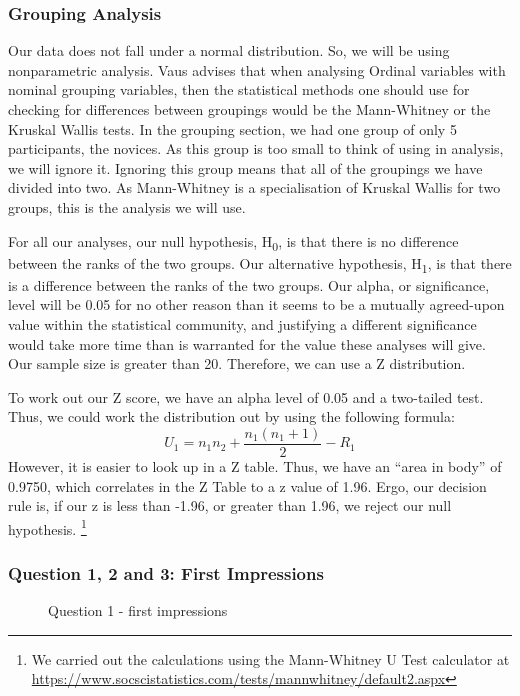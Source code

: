 \subsubsection{Grouping Analysis}
Our data does not fall under a normal distribution. 
So, we will be using nonparametric analysis.
Vaus\cite{de2013surveys} advises that when analysing Ordinal variables with nominal grouping variables, then the statistical methods one should use for checking for differences between groupings would be the Mann-Whitney\cite{mann1947test} or the Kruskal Wallis\cite{kruskal1952use} tests.
In the grouping section, we had one group of only 5 participants, the novices.
As this group is too small to think of using in analysis, we will ignore it.
Ignoring this group means that all of the groupings we have divided into two.
As Mann-Whitney is a specialisation of Kruskal Wallis for two groups, this is the analysis we will use.

For all our analyses, our null hypothesis, H\textsubscript{0}, is that there is no difference between the ranks of the two groups. 
Our alternative hypothesis, H\textsubscript{1}, is that there is a difference between the ranks of the two groups.
Our alpha, or significance, level will be 0.05 for no other reason than it seems to be a mutually agreed-upon value within the statistical community, and justifying a different significance would take more time than is warranted for the value these analyses will give.
Our sample size is greater than 20. 
Therefore, we can use a Z distribution.

To work out our Z score, we have an alpha level of 0.05 and a two-tailed test.
Thus, we could work the distribution out by using the following formula:
\[U_{1}=n_{1}n_{2}+\frac{n_{1}(n_{1}+1)}{2}-R_{1}\]
However, it is easier to look up in a Z table.
Thus, we have an ``area in body'' of 0.9750, which correlates in the Z Table to a z value of 1.96.
Ergo, our decision rule is, if our z is less than -1.96, or greater than 1.96, we reject our null hypothesis.
\footnote{We carried out the calculations using the Mann-Whitney U Test calculator at \url{https://www.socscistatistics.com/tests/mannwhitney/default2.aspx}}

\pagebreak
\subsubsection{Question 1, 2 and 3: First Impressions}

\begin{figure}
    \centering
    \caption{Question 1 - first impressions}
    \label{fig:stackedbar_Q1}
\end{figure} 

